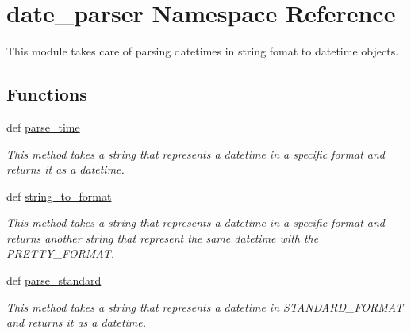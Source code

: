 \hypertarget{namespacedate__parser}{}\section{date\+\_\+parser Namespace Reference}
\label{namespacedate__parser}


This module takes care of parsing datetimes in string fomat to datetime objects.  


\subsection*{Functions}
\begin{DoxyCompactItemize}
\item 
def \hyperlink{namespacedate__parser_ae2ebc5626493efaa6f55506c540cbf39}{parse\+\_\+time}
\begin{DoxyCompactList}\small\item\em This method takes a string that represents a datetime in a specific format and returns it as a datetime. \end{DoxyCompactList}\item 
def \hyperlink{namespacedate__parser_af75a6146e5b426c2256da4016a0e1d88}{string\+\_\+to\+\_\+format}
\begin{DoxyCompactList}\small\item\em This method takes a string that represents a datetime in a specific format and returns another string that represent the same datetime with the P\+R\+E\+T\+T\+Y\+\_\+\+F\+O\+R\+M\+AT. \end{DoxyCompactList}\item 
def \hyperlink{namespacedate__parser_ae84059d175f6c4899d13c0a80de6e054}{parse\+\_\+standard}
\begin{DoxyCompactList}\small\item\em This method takes a string that represents a datetime in S\+T\+A\+N\+D\+A\+R\+D\+\_\+\+F\+O\+R\+M\+AT and returns it as a datetime. \end{DoxyCompactList}\end{DoxyCompactItemize}
